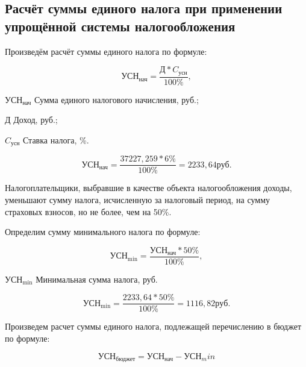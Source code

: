 \tocless\subsection{Расчёт суммы единого налога при применении упрощённой системы налогообложения}

Произведём расчёт суммы единого налога по формуле:

\begin{equation}
    \text{УСН}_\text{нач} = \frac{\text{Д} * C_\text{усн}}{100\%},
\end{equation}

\begin{eqexpl}[25mm]
    \item{$\text{УСН}_\text{нач}$} Сумма единого налогового начисления, руб.;
    \item{Д} Доход, руб.;
    \item{$C_\text{усн}$} Ставка налога, \%.
\end{eqexpl}

\begin{equation*}
    \text{УСН}_\text{нач} = \frac{37227,259 * 6\%}{100\%} = 2233,64 \text{руб}.
\end{equation*}

Налогоплательщики, выбравшие в качестве объекта налогообложения
доходы, уменьшают сумму налога, исчисленную за налоговый период, на
сумму страховых взносов, но не более, чем на 50\%.

Определим сумму минимального налога по формуле:

\begin{equation}
    \text{УСН}_\text{min} = \frac{\text{УСН}_\text{нач} * 50\%}{100\%},
\end{equation}

\begin{eqexpl}[25mm]
    \item{$\text{УСН}_\text{min}$} Минимальная сумма налога, руб.
\end{eqexpl}

\begin{equation*}
    \text{УСН}_\text{min} = \frac{2233,64 * 50\%}{100\%} = 1116,82 руб.
\end{equation*}

Произведем расчет суммы единого налога, подлежащей перечислению
в бюджет по формуле:

\begin{equation}
    \text{УСН}_\text{бюджет} = \text{УСН}_\text{нач} - \text{УСН}_min
\end{equation}

